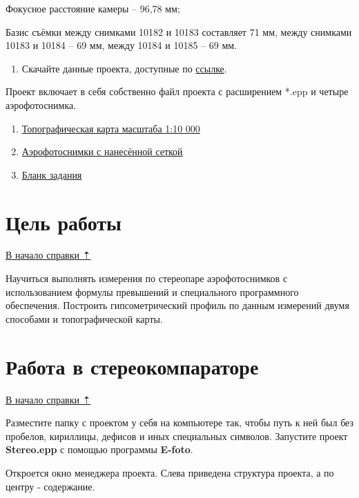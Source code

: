 \documentclass[
  12pt,
]{book}
\providecommand{\tightlist}{%
  \setlength{\itemsep}{0pt}\setlength{\parskip}{0pt}}
\begin{document}
Фокусное расстояние камеры -- 96,78 мм;

Базис съёмки между снимками 10182 и 10183 составляет 71 мм, между снимками 10183 и 10184 -- 69 мм, между 10184 и 10185 -- 69 мм.

\begin{enumerate}
\def\labelenumi{\arabic{enumi})}
\tightlist
\item
  Скачайте данные проекта, доступные по \href{https://yadi.sk/d/3a5RAakJsZoAYg}{ссылке}.
\end{enumerate}

Проект включает в себя собственно файл проекта с расширением *.epp и четыре аэрофотоснимка.

\begin{enumerate}
\def\labelenumi{\arabic{enumi})}
\setcounter{enumi}{1}
\item
  \href{https://yadi.sk/i/gX-dbnhTKGme_A}{Топографическая карта масштаба 1:10 000}
\item
  \href{https://yadi.sk/d/dzFeiJ2zVdx_Hw}{Аэрофотоснимки с нанесённой сеткой}
\item
  \href{https://yadi.sk/i/wJ_0jiAc-nkO6A}{Бланк задания}
\end{enumerate}

\section{Цель работы}\label{stereo-task}

\hyperref[stereo]{В начало справки ⇡}

Научиться выполнять измерения по стереопаре аэрофотоснимков с использованием формулы превышений и специального программного обеспечения. Построить гипсометрический профиль по данным измерений двумя способами и топографической карты.

\section{Работа в стереокомпараторе}\label{stereo-stereoplotter}

\hyperref[stereo]{В начало справки ⇡}

Разместите папку с проектом у себя на компьютере так, чтобы путь к ней был без пробелов, кириллицы, дефисов и иных специальных символов. Запустите проект \textbf{Stereo.epp} с помощью программы \textbf{E-foto}.

Откроется окно менеджера проекта. Слева приведена структура проекта, а по центру - содержание.
\end{document}
